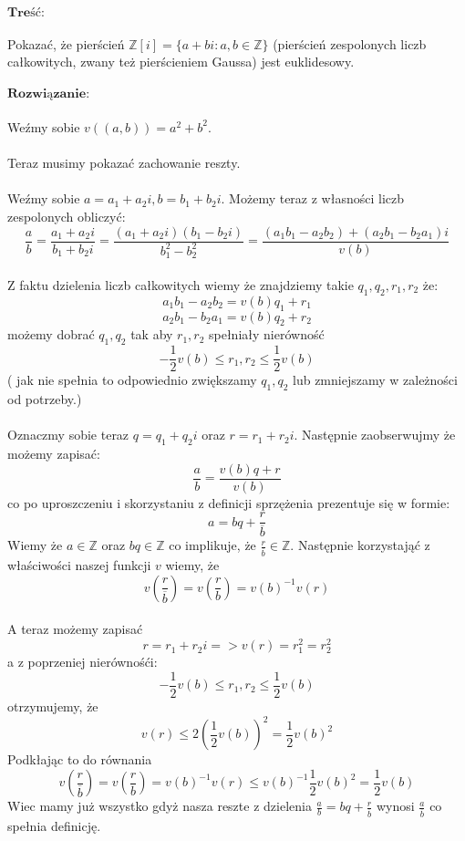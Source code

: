  $\textbf{Treść:}$  \\
\\
Pokazać, że pierścień $\mathbb{Z}[i] = \{a + bi : a, b \in \mathbb{Z}\}$ (pierścień zespolonych liczb
całkowitych, zwany też pierścieniem Gaussa) jest euklidesowy. \\ \\
 $\textbf{Rozwiązanie:}$ \\
 \\
 Weźmy sobie $v((a,b)) = a^2 + b^2$.\\
 \\
 Teraz musimy pokazać zachowanie reszty.\\ \\
 Weźmy sobie $a = a_1 + a_2i, b = b_1 + b_2i$. Możemy teraz z własności liczb zespolonych obliczyć:
 \\
 $$\frac{a}{b} = \frac{a_1 + a_2i}{b_1 + b_2i} = \frac{(a_1 + a_2i)(b_1 - b_2i)}{b_{1}^{2} - b_{2}^{2}} = \frac{(a_1b_1 - a_2b_2) + (a_2b_1 - b_2a_1)i}{v(b)}$$ \\
 Z faktu dzielenia liczb całkowitych wiemy że znajdziemy takie $q_1,q_2,r_1,r_2$ że: \\ 
$$a_1b_1 - a_2b_2 = v(b)q_1 + r_1$$
$$a_2b_1 - b_2a_1 = v(b)q_2 + r_2$$
możemy dobrać $q_1,q_2$ tak aby $r_1,r_2$ spełniały nierówność $$-\frac{1}{2}v(b) \leq r_1,r_2 \leq \frac{1}{2}v(b)$$ ( jak nie spełnia to odpowiednio zwiększamy $q_1,q_2$ lub zmniejszamy w zależności od potrzeby.)
\\
\\ Oznaczmy sobie teraz $q = q_1 + q_2i$ oraz $r = r_1 + r_2i$. Następnie zaobserwujmy że możemy zapisać: $$\frac{a}{b} = \frac{v(b)q + r}{v(b)}$$ co po uproszczeniu i skorzystaniu z definicji sprzężenia prezentuje się w formie: $$a = bq + \frac{r}{\overline{b}}$$ Wiemy że $a \in \mathbb{Z}$ oraz $bq \in \mathbb{Z}$ co implikuje, że $\frac{r}{\overline{b}} \in \mathbb{Z}$. Następnie korzystająć z właściwości naszej funkcji $v$ wiemy, że $$v(\frac{r}{\overline{b}}) = v(\frac{r}{b}) = v(b)^{-1}v(r)$$ \\ A teraz możemy zapisać $$r = r_1 + r_2i => v(r) = r_{1}^{2} = r_{2}^{2}$$ a z poprzeniej nierównośći: $$-\frac{1}{2}v(b) \leq r_1,r_2 \leq \frac{1}{2}v(b)$$ otrzymujemy, że $$v(r) \leq 2(\frac{1}{2}v(b))^2 = \frac{1}{2}v(b)^2$$ Podkłając to do równania $$v(\frac{r}{\overline{b}}) = v(\frac{r}{b}) = v(b)^{-1}v(r) \leq v(b)^{-1}\frac{1}{2}v(b)^2 = \frac{1}{2}v(b)$$
Wiec mamy już wszystko gdyż nasza reszte z dzielenia $\frac{a}{b} = bq + \frac{r}{\overline{b}}$ wynosi $\frac{a}{\overline{b}}$ co spełnia definicję.
 
